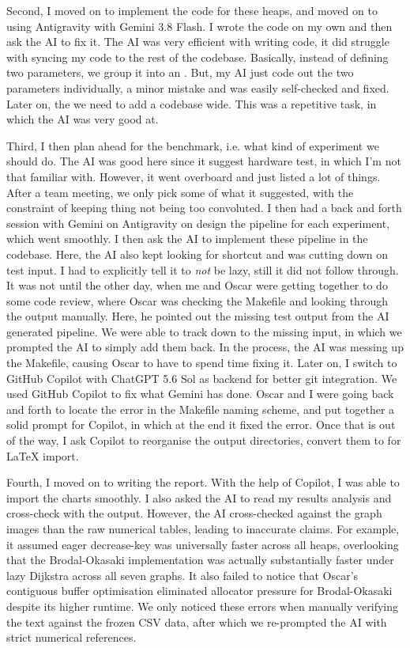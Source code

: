 Second, I moved on to implement the code for these heaps, and moved on to using
Antigravity with Gemini 3.8 Flash. I wrote the code on my own and then ask the
AI to fix it. The AI was very efficient with writing code, it did struggle with
syncing my code to the rest of the codebase. Basically, instead of defining two
parameters, we group it into an . But, my AI just code out the two
parameters individually, a minor mistake and was easily self-checked and fixed.
Later on, the we need to add a  codebase wide. This was
a repetitive task, in which the AI was very good at.

Third, I then plan ahead for the benchmark, i.e. what kind of experiment we
should do. The AI was good here since it suggest hardware test, in which I'm not
that familiar with. However, it went overboard and just listed a lot of
things. After a team meeting, we only pick some of what it suggested, with the
constraint of keeping thing not being too convoluted. I then had a back and
forth session with Gemini on Antigravity on design the pipeline for each
experiment, which went smoothly. I then ask the AI to implement these pipeline
in the codebase. Here, the AI also kept looking for shortcut and was cutting
down on test input. I had to explicitly tell it to \emph{not} be lazy, still it
did not follow through. It was not until the other day, when me and Oscar were
getting together to do some code review, where Oscar was checking the Makefile
and looking through the output manually. Here, he pointed out the missing test
output from the AI generated pipeline. We were able to track down to the missing
input, in which we prompted the AI to simply add them back. In the process, the
AI was messing up the Makefile, causing Oscar to have to spend time fixing it.
Later on, I switch to GitHub Copilot with ChatGPT 5.6 Sol as backend for better
git integration. We used GitHub Copilot to fix what Gemini has done. Oscar and I
were going back and forth to locate the error in the Makefile naming scheme, and
put together a solid prompt for Copilot, in which at the end it fixed the error.
Once that is out of the way, I ask Copilot to reorganise the output directories,
convert them to  for {\LaTeX} import.

Fourth, I moved on to writing the report. With the help of Copilot, I was able
to import the charts smoothly. I also asked the AI to read my results analysis
and cross-check with the output. However, the AI cross-checked against the graph
images than the raw numerical tables, leading to inaccurate claims. For example,
it assumed eager decrease-key was universally faster across all heaps,
overlooking that the Brodal-Okasaki implementation was actually substantially
faster under lazy Dijkstra across all seven graphs. It also failed to notice
that Oscar's contiguous buffer optimisation eliminated allocator pressure for
Brodal-Okasaki despite its higher runtime. We only noticed these errors when
manually verifying the text against the frozen CSV data, after which we
re-prompted the AI with strict numerical references.


